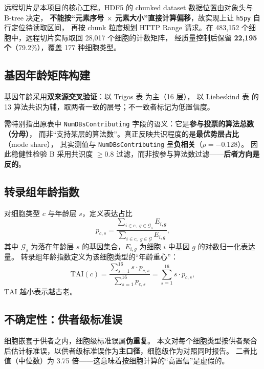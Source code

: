 \documentclass[numsec,webpdf,modern,large]{oup-authoring-template}
\newcommand{\tai}{\textrm{TAI}}
\begin{document}
远程切片是本项目的核心工程。HDF5 的 chunked dataset 数据位置由对象头与 B-tree 决定，
\textbf{不能按“元素序号 $\times$ 元素大小”直接计算偏移}，故实现上让 \texttt{h5py} 自行定位待读取区间，
再按 chunk 粒度规划 HTTP Range 请求。在 483,152 个细胞中，远程切片实际取回 28,017 个细胞的计数矩阵，
经质量控制后保留 \textbf{22,195 个}（79.2\%），覆盖 177 种细胞类型。

\subsection{基因年龄矩阵构建}

基因年龄采用\textbf{双来源交叉验证}：以 Trigos 表\citeyearpar{trigos2017} 为主（16 层），
以 Liebeskind 表\citeyearpar{liebeskind2016} 的 13 算法共识为辅，取两者一致的层号；不一致者标记为低置信度。

需特别指出原表中 \texttt{NumDBsContributing} 字段的语义：它是\textbf{参与投票的算法总数（分母）}，
而非“支持某层的算法数”。真正反映共识程度的是\textbf{最优势层占比}（mode share），
其实测值与 \texttt{NumDBsContributing} 呈\textbf{负相关}（$\rho = -0.128$）。
因此稳健性检验 B 采用共识度 $\ge 0.8$ 过滤，而非按参与算法数过滤——\textbf{后者方向是反的}。

\subsection{转录组年龄指数}

对细胞类型 $c$ 与年龄层 $s$，定义表达占比
\begin{equation}
  p_{c,s} = \frac{\sum_{i \in c,\; g \in \mathcal{G}_s} E_{i,g}}{\sum_{i \in c,\; g \in \mathcal{G}} E_{i,g}},
  \label{eq:pcs}
\end{equation}
其中 $\mathcal{G}_s$ 为落在年龄层 $s$ 的基因集合，$E_{i,g}$ 为细胞 $i$ 中基因 $g$ 的对数归一化表达量。
转录组年龄指数定义为该细胞类型的“年龄重心”：
\begin{equation}
  \tai(c) = \frac{\sum_{s=1}^{16} s \cdot p_{c,s}}{\sum_{s=1}^{16} p_{c,s}} = \sum_{s=1}^{16} s \cdot p_{c,s},
  \label{eq:tai}
\end{equation}
$\tai$ 越小表示越古老。

\subsection{不确定性：供者级标准误}

细胞嵌套于供者之内，细胞级标准误属\textbf{伪重复}\citep{hafemeister2019}。
本文对每个细胞类型按供者聚合后估计标准误，以供者级标准误作为\textbf{主口径}，细胞级作为对照同时报告。
二者比值（中位数）为 3.75 倍——这意味着按细胞计算的“高置信”是虚假的。
\end{document}
